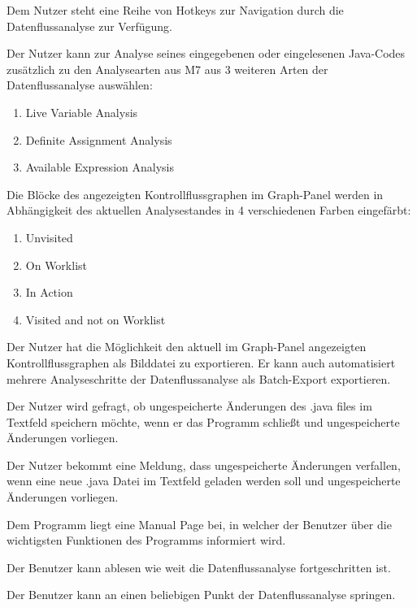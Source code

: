 Dem Nutzer steht eine Reihe von Hotkeys zur Navigation durch die
Datenflussanalyse zur Verfügung.

Der Nutzer kann zur Analyse seines eingegebenen oder eingelesenen Java-Codes
zusätzlich zu den Analysearten aus M7 aus 3 weiteren Arten der Datenflussanalyse
auswählen:
\begin{enumerate}[label=(\alph*)]
\item  Live Variable Analysis
\item Definite Assignment Analysis
\item Available Expression Analysis
\end{enumerate}

Die Blöcke des angezeigten Kontrollflussgraphen im Graph-Panel werden in
Abhängigkeit des aktuellen Analysestandes in 4 verschiedenen Farben eingefärbt:
\begin{enumerate}[label=(\alph*)]
\item Unvisited
\item On Worklist
\item In Action
\item Visited and not on Worklist
\end{enumerate}

Der Nutzer hat die Möglichkeit den aktuell im Graph-Panel angezeigten Kontrollflussgraphen als Bilddatei zu exportieren. Er kann auch automatisiert mehrere Analyseschritte der Datenflussanalyse als Batch-Export exportieren.

Der Nutzer wird gefragt, ob ungespeicherte Änderungen des .java files im Textfeld
speichern möchte, wenn er das Programm schließt und ungespeicherte Änderungen vorliegen.

Der Nutzer bekommt eine Meldung, dass ungespeicherte Änderungen verfallen,
wenn eine neue .java Datei im Textfeld geladen werden soll und ungespeicherte
Änderungen vorliegen.

Dem Programm liegt eine Manual Page bei, in welcher der Benutzer über die wichtigsten Funktionen des Programms informiert wird.

Der Benutzer kann ablesen wie weit die Datenflussanalyse fortgeschritten ist.

Der Benutzer kann an einen beliebigen Punkt der Datenflussanalyse springen.
